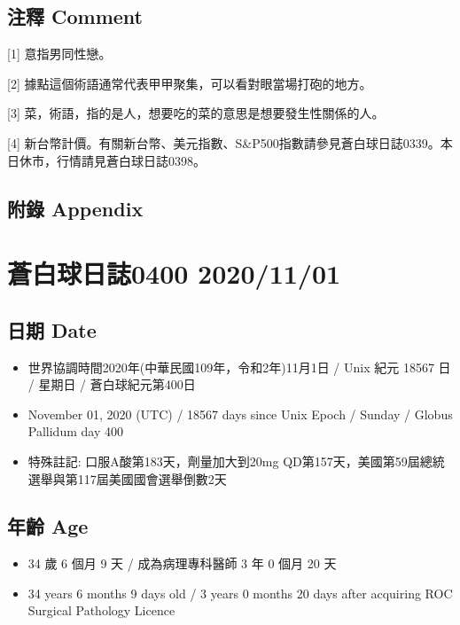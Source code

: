 \documentclass[a5paper, 11pt
]{book}
\providecommand{\tightlist}{%
  \setlength{\itemsep}{0pt}\setlength{\parskip}{0pt}}
\begin{document}
\hypertarget{ux6ce8ux91cb-comment-57}{%
\subsection{注釋 Comment}\label{ux6ce8ux91cb-comment-57}}

{[}1{]} 意指男同性戀。

{[}2{]} 據點這個術語通常代表甲甲聚集，可以看對眼當場打砲的地方。

{[}3{]} 菜，術語，指的是人，想要吃的菜的意思是想要發生性關係的人。

{[}4{]}
新台幣計價。有關新台幣、美元指數、S\&P500指數請參見蒼白球日誌0339。本日休市，行情請見蒼白球日誌0398。

\hypertarget{ux9644ux9304-appendix-57}{%
\subsection{附錄 Appendix}\label{ux9644ux9304-appendix-57}}

\hypertarget{ux84bcux767dux7403ux65e5ux8a8c0400-20201101}{%
\section{蒼白球日誌0400
2020/11/01}\label{ux84bcux767dux7403ux65e5ux8a8c0400-20201101}}

\hypertarget{ux65e5ux671f-date-58}{%
\subsection{日期 Date}\label{ux65e5ux671f-date-58}}

\begin{itemize}
\tightlist
\item
  世界協調時間2020年(中華民國109年，令和2年)11月1日 / Unix 紀元 18567 日
  / 星期日 / 蒼白球紀元第400日
\item
  November 01, 2020 (UTC) / 18567 days since Unix Epoch / Sunday /
  Globus Pallidum day 400
\item
  特殊註記: 口服A酸第183天，劑量加大到20mg
  QD第157天，美國第59屆總統選舉與第117屆美國國會選舉倒數2天
\end{itemize}

\hypertarget{ux5e74ux9f61-age-58}{%
\subsection{年齡 Age}\label{ux5e74ux9f61-age-58}}

\begin{itemize}
\tightlist
\item
  34 歲 6 個月 9 天 / 成為病理專科醫師 3 年 0 個月 20 天
\item
  34 years 6 months 9 days old / 3 years 0 months 20 days after
  acquiring ROC Surgical Pathology Licence
\end{itemize}
\end{document}
